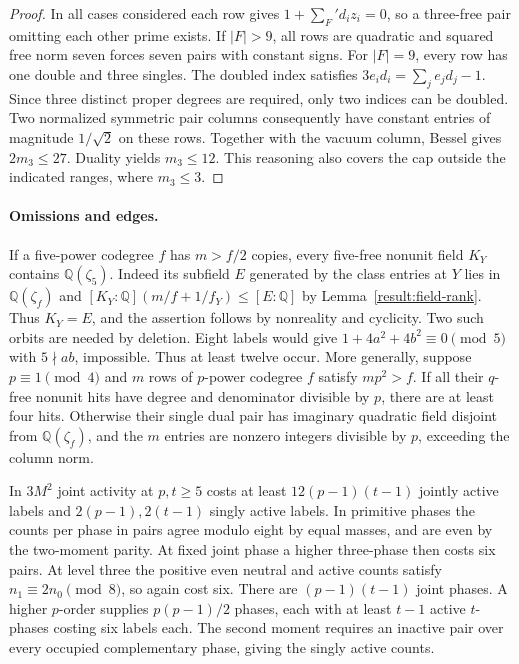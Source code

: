 \documentclass[11pt]{amsart}
\numberwithin{equation}{section}
\theoremstyle{definition}
\theoremstyle{plain}
\newcommand{\QQ}{\mathbb Q}
\begin{document}
\begin{proof}
In all cases considered each row gives $1+\sum_F' d_i z_i=0$, so a
three-free pair omitting each other prime exists. If $|F|>9$, all rows
are quadratic and squared free norm seven forces seven pairs with
constant signs. For $|F|=9$, every row has one double and three singles.
The doubled index satisfies $3e_i d_i=\sum_j e_jd_j-1$. Since three
distinct proper degrees are required, only two indices can be doubled.
Two normalized symmetric pair columns consequently have constant entries
of magnitude $1/\sqrt2$ on these rows. Together with the vacuum column,
Bessel gives $2m_3\le27$. Duality yields $m_3\le12$. This reasoning
also covers the cap outside the indicated ranges, where $m_3\le3$.
\end{proof}

\paragraph{Omissions and edges.}
If a five-power codegree $f$ has $m>f/2$ copies, every five-free nonunit
field $K_Y$ contains $\QQ(\zeta_5)$. Indeed its subfield $E$
generated by the class entries at $Y$ lies in $\QQ(\zeta_f)$ and
$[K_Y:\QQ](m/f+1/f_Y)\le[E:\QQ]$ by
Lemma~\ref{result:field-rank}. Thus $K_Y=E$, and the assertion follows
by nonreality and cyclicity. Two such
orbits are needed by deletion. Eight labels would give
$1+4a^2+4b^2\equiv0\pmod5$ with $5\nmid ab$, impossible. Thus at
least twelve occur. More generally, suppose $p\equiv1\pmod4$ and
$m$ rows of $p$-power codegree $f$ satisfy $mp^2>f$. If all their
$q$-free nonunit hits have degree and denominator divisible by $p$, there
are at least four hits. Otherwise their single dual pair has imaginary
quadratic field disjoint from $\QQ(\zeta_f)$, and the $m$ entries are
nonzero integers divisible by $p$, exceeding the column norm.

In $3M^2$ joint activity at $p,t\ge5$ costs at least
$12(p-1)(t-1)$ jointly active labels and $2(p-1),2(t-1)$ singly active
labels. In primitive phases the counts per phase in pairs agree modulo
eight by equal masses, and are even by the two-moment parity. At fixed
joint phase a higher three-phase then costs six pairs. At level three
the positive even neutral and active counts satisfy
$n_1\equiv2n_0\pmod8$, so again cost six. There are $(p-1)(t-1)$
joint phases. A higher $p$-order supplies $p(p-1)/2$ phases, each with
at least $t-1$ active $t$-phases costing six labels each. The second
moment requires an inactive pair over every occupied complementary
phase, giving the singly active counts.
\end{document}
